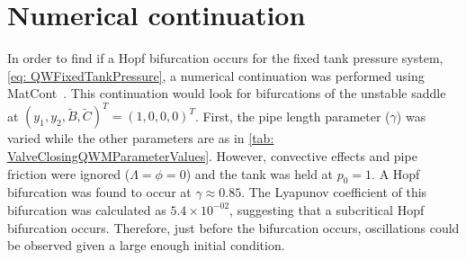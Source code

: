 \chapter{Numerical continuation} \label{sec: Continuation}

In order to find if a Hopf bifurcation occurs for the fixed tank pressure system, \cref{eq: QWFixedTankPressure}, a numerical continuation was performed using MatCont~\cite{Dhooge2003MATCONT}. This continuation would look for bifurcations of the unstable saddle at $(y_1,y_2,\tilde{B},\tilde{C})^T = (1,0,0,0)^T$. First, the pipe length parameter ($\gamma$) was varied while the other parameters are as in \cref{tab: ValveClosingQWMParameterValues}. However, convective effects and pipe friction were ignored ($\Lambda = \phi = 0$) and the tank was held at $p_0 = 1$. A Hopf bifurcation was found to occur at $\gamma \approx 0.85$.
The Lyapunov coefficient of this bifurcation was calculated as  $5.4 \times 10^{-02}$, suggesting that a subcritical Hopf bifurcation occurs. Therefore, just before the bifurcation occurs, oscillations could be observed given a large enough initial condition.

